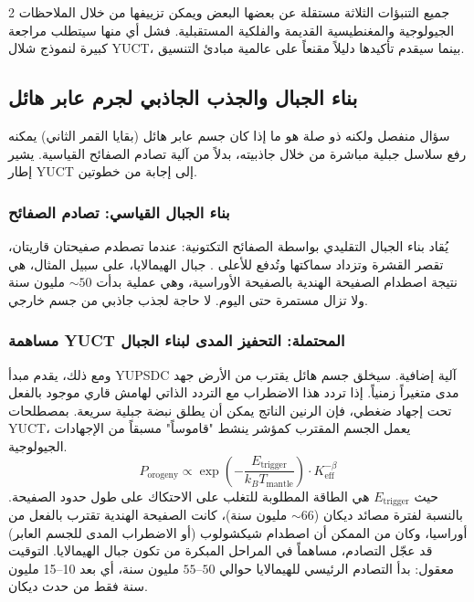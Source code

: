 \documentclass[11pt,a4paper]{article}
\begin{document}
\begin{multicols}{2}
		جميع التنبؤات الثلاثة مستقلة عن بعضها البعض ويمكن تزييفها من خلال الملاحظات الجيولوجية والمغنطيسية القديمة والفلكية المستقبلية. فشل أي منها سيتطلب مراجعة كبيرة لنموذج شلال YUCT، بينما سيقدم تأكيدها دليلاً مقنعاً على عالمية مبادئ التنسيق.
		
		\subsection{بناء الجبال والجذب الجاذبي لجرم عابر هائل}
		سؤال منفصل ولكنه ذو صلة هو ما إذا كان جسم عابر هائل (بقايا القمر الثاني) يمكنه رفع سلاسل جبلية مباشرة من خلال جاذبيته، بدلاً من آلية تصادم الصفائح القياسية. يشير إطار YUCT إلى إجابة من خطوتين.
		
		\subsubsection{بناء الجبال القياسي: تصادم الصفائح}
		يُقاد بناء الجبال التقليدي بواسطة الصفائح التكتونية: عندما تصطدم صفيحتان قاريتان، تقصر القشرة وتزداد سماكتها وتُدفع للأعلى \cite{Kearey2013}. جبال الهيمالايا، على سبيل المثال، هي نتيجة اصطدام الصفيحة الهندية بالصفيحة الأوراسية، وهي عملية بدأت \(\sim 50\) مليون سنة ولا تزال مستمرة حتى اليوم. لا حاجة لجذب جاذبي من جسم خارجي.
		
		\subsubsection{مساهمة YUCT المحتملة: التحفيز المدى لبناء الجبال}
		ومع ذلك، يقدم مبدأ YUPSDC آلية إضافية. سيخلق جسم هائل يقترب من الأرض جهد مدى متغيراً زمنياً. إذا تردد هذا الاضطراب مع التردد الذاتي لهامش قاري موجود بالفعل تحت إجهاد ضغطي، فإن الرنين الناتج يمكن أن يطلق نبضة جبلية سريعة. بمصطلحات YUCT، يعمل الجسم المقترب كمؤشر ينشط "قاموساً" مسبقاً من الإجهادات الجيولوجية.
		\begin{equation}
			P_{\text{orogeny}} \propto \exp\left(-\frac{E_{\text{trigger}}}{k_B T_{\text{mantle}}}\right) \cdot K_{\mathrm{eff}}^{-\beta}
		\end{equation}
		حيث \(E_{\text{trigger}}\) هي الطاقة المطلوبة للتغلب على الاحتكاك على طول حدود الصفيحة. بالنسبة لفترة مصائد ديكان (\(\sim 66\) مليون سنة)، كانت الصفيحة الهندية تقترب بالفعل من أوراسيا، وكان من الممكن أن اصطدام شيكشولوب (أو الاضطراب المدى للجسم العابر) قد عجّل التصادم، مساهماً في المراحل المبكرة من تكون جبال الهيمالايا. التوقيت معقول: بدأ التصادم الرئيسي للهيمالايا حوالي \(50\)–\(55\) مليون سنة، أي بعد 10–15 مليون سنة فقط من حدث ديكان.
		

\end{multicols}
\end{document}
